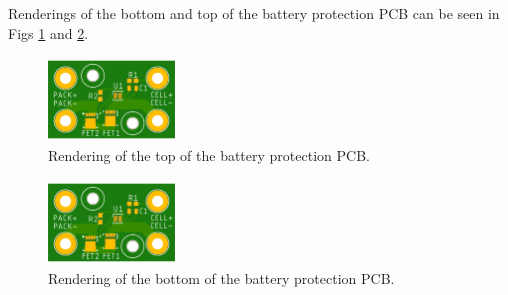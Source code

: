 \documentclass{article}
\begin{document}
Renderings of the bottom and top of the battery protection PCB can be seen in Figs \ref{fig:bat-top} and \ref{fig:bat-bottom}.


\begin{figure}[H]
    \centering
    \includegraphics[width=0.3\textwidth]{images/BatteryProtection-render-top.png}
    \caption{Rendering of the top of the battery protection PCB.}
    \label{fig:bat-top}
\end{figure}


\begin{figure}[H]
    \centering
    \includegraphics[width=0.3\textwidth]{images/BatteryProtection-render-top.png}
    \caption{Rendering of the bottom of the battery protection PCB.}
    \label{fig:bat-bottom}
\end{figure}



\end{document}
